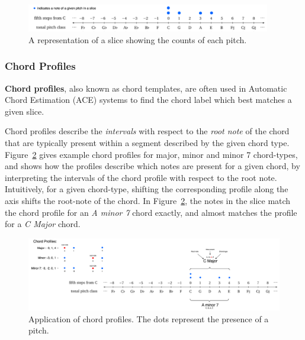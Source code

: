 \documentclass[12pt,a4paper,twoside,openany]{report} \usepackage[pdfborder={0 0 0}]{hyperref}    %
\theoremstyle{definition} \newtheorem{definition}{Definition}[section]
\begin{document}
\begin{figure}[ht]
  \begin{center}
    \includegraphics[width=0.95\textwidth]{figs/prep/inferringHarmony/sliceRep/cMaj.png}
  \end{center}
  \caption{A representation of a slice showing the counts of each pitch.}
  \label{fig:slices}
\end{figure}

\subsubsection{Chord Profiles}
\label{sub:chordProfiles}

\textbf{Chord profiles}, also known as chord templates, are often used in Automatic Chord Estimation (ACE) systems to
find the chord label which best matches a given slice. 

Chord profiles describe the \textit{intervals} with respect to the \textit{root note} of the chord that
are typically present within a segment described by the given chord type. Figure~\ref{fig:chordProfiles} gives
example chord profiles for major, minor and minor 7 chord-types, and shows how the profiles describe which notes are present for
a given chord, by interpreting the intervals of the chord profile with respect to the root note. Intuitively, for
a given chord-type, shifting the corresponding profile along the axis shifts the root-note of the chord. In
Figure~\ref{fig:chordProfiles}, the notes in the slice match the chord profile for an \textit{A minor 7} chord exactly,
and almost matches the profile for a \textit{C Major} chord.

\begin{figure}[ht]
  \begin{center}
    \includegraphics[width=\textwidth]{figs/prep/inferringHarmony/chordProfiles.png}
  \end{center}
  \caption{Application of chord profiles. The dots represent the presence of a pitch.}
  \label{fig:chordProfiles}
\end{figure}
\end{document}
